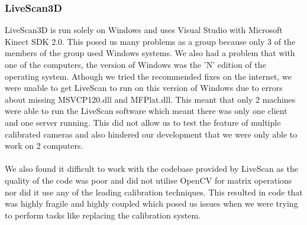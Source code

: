 \documentclass{article}
\begin{document}
\subsubsection{LiveScan3D}
LiveScan3D is run solely on Windows and uses Visual Studio with Microsoft Kinect SDK 2.0. This posed us many problems as a group because only 3 of the members of the group used Windows systems. We also had a problem that with one of the computers, the version of Windows was the 'N' edition of the operating system. Athough we tried the recommended fixes on the internet, we were unable to get LiveScan to run on this version of Windows due to errors about missing MSVCP120.dll and MFPlat.dll. This meant that only 2 machines were able to run the LiveScan software which meant there was only one client and one server running. This did not allow us to test the feature of multiple calibrated cameras and also hindered our development that we were only able to work on 2  computers.
\\\\
We also found it difficult to work with the codebase provided by LiveScan as the quality of the code was poor and did not utilise OpenCV for matrix operations nor did it use any of the leading calibration techniques. This resulted in code that was highly fragile and highly coupled which posed us issues when we were trying to perform tasks like replacing the calibration system.
\end{document}
